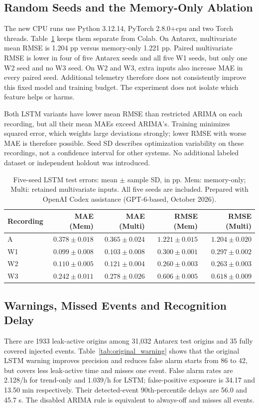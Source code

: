 \subsection{Random Seeds and the Memory-Only Ablation}
The new CPU runs use Python 3.12.14, PyTorch 2.8.0+cpu and two Torch threads. Table~\ref{tab:ablation} keeps them separate from Colab. On Antarex, multivariate mean RMSE is 1.204 pp versus memory-only 1.221 pp. Paired multivariate RMSE is lower in four of five Antarex seeds and all five W1 seeds, but only one W2 seed and no W3 seed. On W2 and W3, extra inputs also increase MAE in every paired seed. Additional telemetry therefore does not consistently improve this fixed model and training budget. The experiment does not isolate which feature helps or harms.

Both LSTM variants have lower mean RMSE than restricted ARIMA on each recording, but all their mean MAEs exceed ARIMA's. Training minimizes squared error, which weights large deviations strongly; lower RMSE with worse MAE is therefore possible. Seed SD describes optimization variability on these recordings, not a confidence interval for other systems. No additional labeled dataset or independent holdout was introduced.


\begin{table}[htbp]
\caption{Five-seed LSTM test errors: mean $\pm$ sample SD, in pp. Mem: memory-only; Multi: retained multivariate inputs. All five seeds are included. Prepared with OpenAI Codex assistance (GPT-6-based, October 2026).}
\label{tab:ablation}
\centering\small
\setlength{\tabcolsep}{4pt}
\begin{tabular}{@{}lrrrr@{}}
\toprule
Recording & MAE (Mem) & MAE (Multi) & RMSE (Mem) & RMSE (Multi)\\
\midrule
A & $0.378\pm0.018$ & $0.365\pm0.024$ & $1.221\pm0.015$ & $1.204\pm0.020$\\
W1 & $0.099\pm0.008$ & $0.103\pm0.008$ & $0.300\pm0.001$ & $0.297\pm0.002$\\
W2 & $0.110\pm0.005$ & $0.121\pm0.004$ & $0.260\pm0.003$ & $0.263\pm0.003$\\
W3 & $0.242\pm0.011$ & $0.278\pm0.026$ & $0.606\pm0.005$ & $0.618\pm0.009$\\
\bottomrule
\end{tabular}
\end{table}


\subsection{Warnings, Missed Events and Recognition Delay}
There are 1933 leak-active origins among 31,032 Antarex test origins and 35 fully covered injected events. Table~\ref{tab:original_warning} shows that the original LSTM warning improves precision and reduces false alarm starts from 86 to 42, but covers less leak-active time and misses one event. False alarm rates are 2.128/h for trend-only and 1.039/h for LSTM; false-positive exposure is 34.17 and 13.50 min respectively. Their detected-event 90th-percentile delays are 56.0 and 45.7 s. The disabled ARIMA rule is equivalent to always-off and misses all events.

